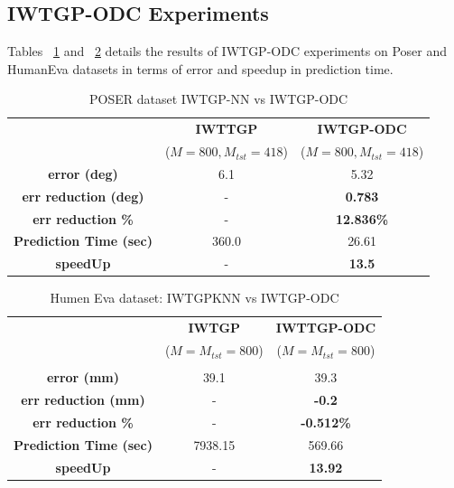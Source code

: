 \begin{appendices}


\section{IWTGP-ODC Experiments}
Tables ~\ref{tab:poserw} and ~\ref{tab:hevaresw} details the results of IWTGP-ODC experiments on Poser and HumanEva datasets in terms of error and speedup in prediction time.


\begin{table}[htbp]
  \centering
    \scalebox{0.8}
  {
     \begin{tabular}{|c|cc|}
      \hline
    \multirow{2}[4]{*}{\textbf{}} & \textbf{IWTTGP} & \multicolumn{1}{c|}{\textbf{IWTGP-ODC}} \\
     	& ($M = 800, M_{tst} = 418$)  & ($M = 800, M_{tst} = 418$)	\\ \hline
    \textbf{error (deg)} & 6.1 &  5.32 \\
    \textbf{err reduction (deg)} & -     &  \textbf{0.783 }\\
    \textbf{err reduction \%} & -     & \textbf{12.836\%} \\
    \textbf{Prediction Time (sec)} & 360.0  & 26.61 \\
    \textbf{speedUp} & -      & \textbf{13.5} \\ \hline
    \end{tabular}%
    }
  \caption{POSER dataset IWTGP-NN vs  IWTGP-ODC}
 \label{tab:poserw}%
\end{table}%

\begin{table}[htbp]
  \centering
  \scalebox{0.9}
  {
\begin{tabular}{|c|cc|}
\hline
    \multirow{2}[4]{*}{\textbf{}} & \textbf{IWTGP} & \multicolumn{1}{c|}{\textbf{IWTTGP-ODC}} \\
    & ($M = M_{tst} = 800$)& ($M=M_{tst}=800$)\\  \hline
          & \textbf{}  & \textbf{ } \\
    \textbf{error (mm)} & 39.1  & 39.3 \\
    \textbf{err reduction (mm)} & -     & \textbf{\textbf{-0.2}} \\
    \textbf{err reduction \%} & -   & \textbf{\textbf{-0.512\%}} \\
    \textbf{Prediction Time (sec)} & 7938.15 &  569.66 \\
    \textbf{speedUp} & -     &  \textbf{13.92}\\ \hline
    \end{tabular}%
    }
 \caption{Humen Eva dataset: IWTGPKNN vs IWTGP-ODC}
  \label{tab:hevaresw}
\end{table}%





\end{appendices}
